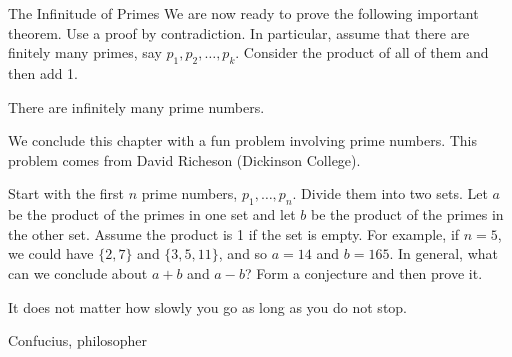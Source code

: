 \begin{section}{The Infinitude of Primes}
We are now ready to prove the following important theorem. Use a proof by contradiction. In particular, assume that there are finitely many primes, say $p_1, p_2,\ldots,p_k$.  Consider the product of all of them and then add 1.

\begin{theorem}\label{thm:infprimes}
There are infinitely many prime numbers.
\end{theorem}

We conclude this chapter with a fun problem involving prime numbers.  This problem comes from David Richeson (Dickinson College).  %

\begin{problem}
Start with the first $n$ prime numbers, $p_1,\ldots, p_n$. Divide them into two sets. Let $a$ be the product of the primes in one set and let $b$ be the product of the primes in the other set. Assume the product is 1 if the set is empty. For example, if $n=5$, we could have $\{2,7\}$ and $\{3,5,11\}$, and so $a=14$ and $b=165$. In general, what can we conclude about $a+b$ and $a-b$? Form a conjecture and then prove it.
\end{problem}

\epigraph{It does not matter how slowly you go as long as you do not stop.}{Confucius, philosopher}

\end{section}